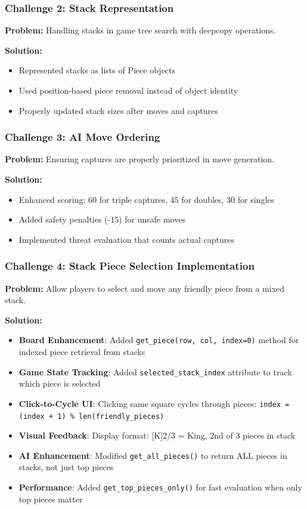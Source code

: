 \documentclass[12pt,a4paper]{article}
\begin{document}
\subsubsection{Challenge 2: Stack Representation}

\textbf{Problem:} Handling stacks in game tree search with deepcopy operations.

\textbf{Solution:}
\begin{itemize}
    \item Represented stacks as lists of Piece objects
    \item Used position-based piece removal instead of object identity
    \item Properly updated stack sizes after moves and captures
\end{itemize}

\subsubsection{Challenge 3: AI Move Ordering}

\textbf{Problem:} Ensuring captures are properly prioritized in move generation.

\textbf{Solution:}
\begin{itemize}
    \item Enhanced scoring: 60 for triple captures, 45 for doubles, 30 for singles
    \item Added safety penalties (-15) for unsafe moves
    \item Implemented threat evaluation that counts actual captures
\end{itemize}

\subsubsection{Challenge 4: Stack Piece Selection Implementation}

\textbf{Problem:} Allow players to select and move any friendly piece from a mixed stack.

\textbf{Solution:}
\begin{itemize}
    \item \textbf{Board Enhancement}: Added \texttt{get\_piece(row, col, index=0)} method for indexed piece retrieval from stacks
    \item \textbf{Game State Tracking}: Added \texttt{selected\_stack\_index} attribute to track which piece is selected
    \item \textbf{Click-to-Cycle UI}: Clicking same square cycles through pieces: \texttt{index = (index + 1) \% len(friendly\_pieces)}
    \item \textbf{Visual Feedback}: Display format: [K]2/3 = King, 2nd of 3 pieces in stack
    \item \textbf{AI Enhancement}: Modified \texttt{get\_all\_pieces()} to return ALL pieces in stacks, not just top pieces
    \item \textbf{Performance}: Added \texttt{get\_top\_pieces\_only()} for fast evaluation when only top pieces matter
\end{itemize}
\end{document}
